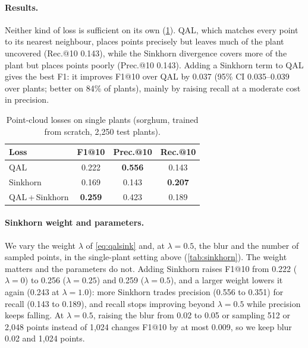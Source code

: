\documentclass[10pt,twocolumn,letterpaper]{article}
\begin{document}
\paragraph{Results.}
Neither kind of loss is sufficient on its own (\cref{tab:loss_single}). QAL, which matches every point to its
nearest neighbour, places points precisely but leaves much of the plant uncovered (Rec.@10 0.143), while the
Sinkhorn divergence covers more of the plant but places points poorly (Prec.@10 0.143). Adding a Sinkhorn term to
QAL gives the best F1: it improves F1@10 over QAL by 0.037 (95\% CI 0.035--0.039 over plants; better on 84\% of
plants), mainly by raising recall at a moderate cost in precision.

\begin{table}[t]
  \caption{Point-cloud losses on single plants (sorghum, trained from scratch, 2{,}250 test plants).}
  \label{tab:loss_single}
  \centering
  \small
  \setlength{\tabcolsep}{3pt}
  \begin{tabular}{@{}lccc@{}}
    \toprule
    Loss & F1@10 & Prec.@10 & Rec.@10 \\
    \midrule
    QAL                    & 0.222          & \textbf{0.556} & 0.143 \\
    Sinkhorn               & 0.169          & 0.143          & \textbf{0.207} \\
    QAL\,+\,Sinkhorn       & \textbf{0.259} & 0.423          & 0.189 \\
    \bottomrule
  \end{tabular}
\end{table}

\paragraph{Sinkhorn weight and parameters.}
We vary the weight $\lambda$ of \cref{eq:qalsink} and, at $\lambda=0.5$, the blur and the number of sampled points,
in the single-plant setting above (\cref{tab:sinkhorn}). The weight matters and the parameters do not. Adding
Sinkhorn raises F1@10 from 0.222 ($\lambda=0$) to 0.256 ($\lambda=0.25$) and 0.259 ($\lambda=0.5$), and a larger
weight lowers it again (0.243 at $\lambda=1.0$): more Sinkhorn trades precision (0.556 to 0.351) for recall (0.143
to 0.189), and recall stops improving beyond $\lambda=0.5$ while precision keeps falling. At $\lambda=0.5$, raising
the blur from 0.02 to 0.05 or sampling 512 or 2{,}048 points instead of 1{,}024 changes F1@10 by at most 0.009, so we
keep blur 0.02 and 1{,}024 points.
\end{document}

